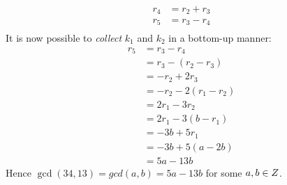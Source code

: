 \begin{remark}
\begin{equation}
\begin{aligned}
                r_4         &= r_2 + r_3 \\
                \boxed{r_5} &= r_3 - r_4 \\
                \phantom{}  &\phantom{}
            \end{aligned}
        \end{equation}
        It is now possible to \textit{collect} $k_1$ and $k_2$ in a bottom-up manner:
        \begin{align}
            \boxed{r_5} &= r_3 - r_4 \\
                        &= r_3 - (r_2 - r_3) \\
                        &= -r_2 + 2r_3 \\
                        &= -r_2 - 2(r_1 - r_2) \\
                        &= 2r_1 - 3r_2 \\
                        &= 2r_1 - 3(b - r_1) \\
                        &= -3b + 5r_1 \\
                        &= -3b + 5(a - 2b) \\
                        &= 5a - 13b
        \end{align}
        Hence $\gcd(34, 13) = gcd(a, b) = 5a - 13b$ for some $a, b \in \relax{Z}$.
\end{remark}
